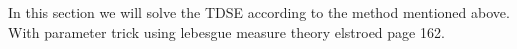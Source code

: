 \label{sec:tdsesolution}
In this section we will solve the TDSE according to the method mentioned above. With parameter trick using lebesgue measure theory elstroed page 162.
